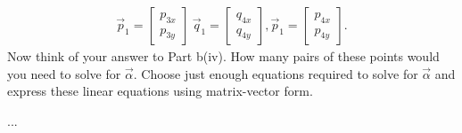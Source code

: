 \documentclass[11pt]{article}
\begin{document}
\begin{enumerate}
\begin{enumerate}
\[\begin{aligned}
                              \vec p_1 = \begin{bmatrix}
                                            p_{3x} \\
                                            p_{3y}
                                       \end{bmatrix} \
                              \vec q_1 = \begin{bmatrix}
                                            q_{4x} \\
                                            q_{4y}
                                       \end{bmatrix},
                              \vec p_1 = \begin{bmatrix}
                                            p_{4x} \\
                                            p_{4y}
                                       \end{bmatrix}.
                        \end{aligned}\]
                Now think of your answer to Part b(iv). How many pairs of these points would you need to solve for
                $\vec \alpha$. Choose just enough equations required to solve for $\vec \alpha$ and express these linear equations using
                matrix-vector form.
                \begin{Answer}
                        ...
                \end{Answer}
       \end{enumerate}
   
     
   

\end{enumerate}
\end{document}
